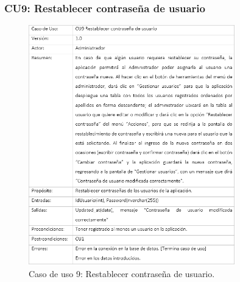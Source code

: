 		\subsubsection{CU9: Restablecer contraseña de usuario}
			\begin{figure}[htbp!]
				\centering
					\includegraphics[width=0.8\textwidth]{images/CU/CU9}
					\caption{Caso de uso 9: Restablecer contraseña de usuario.}
				\label{Tabla}
			\end{figure}
			
